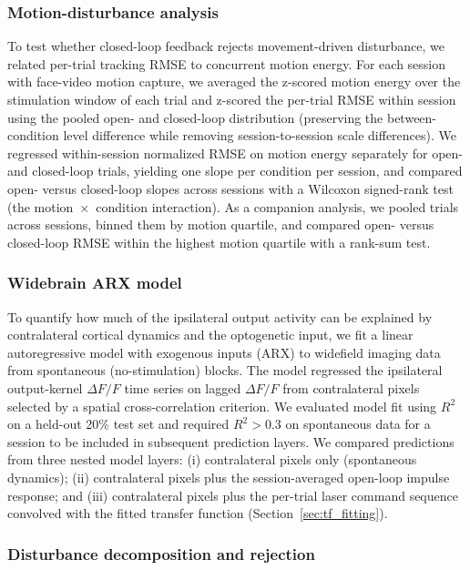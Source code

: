 \subsubsection*{Motion-disturbance analysis}

To test whether closed-loop feedback rejects movement-driven disturbance, we
related per-trial tracking RMSE to concurrent motion energy. For each session
with face-video motion capture, we averaged the z-scored motion energy over the
stimulation window of each trial and z-scored the per-trial RMSE within session
using the pooled open- and closed-loop distribution (preserving the
between-condition level difference while removing session-to-session scale
differences). We regressed within-session normalized RMSE on motion energy
separately for open- and closed-loop trials, yielding one slope per condition
per session, and compared open- versus closed-loop slopes across sessions with
a Wilcoxon signed-rank test (the motion~$\times$~condition interaction). As a
companion analysis, we pooled trials across sessions, binned them by motion
quartile, and compared open- versus closed-loop RMSE within the highest motion
quartile with a rank-sum test.

\subsubsection*{Widebrain ARX model}

To quantify how much of the ipsilateral output activity can be explained
by contralateral cortical dynamics and the optogenetic input, we fit a
linear autoregressive model with exogenous inputs (ARX) to widefield
imaging data from spontaneous (no-stimulation) blocks. The model
regressed the ipsilateral output-kernel $\Delta F/F$ time series on
lagged $\Delta F/F$ from contralateral pixels selected by a spatial
cross-correlation criterion. We evaluated model fit using $R^2$ on a
held-out 20\% test set and required $R^2 > 0.3$ on spontaneous data for
a session to be included in subsequent prediction layers. We compared
predictions from three nested model layers: (i) contralateral pixels
only (spontaneous dynamics); (ii) contralateral pixels plus the
session-averaged open-loop impulse response; and (iii) contralateral
pixels plus the per-trial laser command sequence convolved with the
fitted transfer function (Section~\ref{sec:tf_fitting}).

\subsubsection*{Disturbance decomposition and rejection}
\label{sec:disturbance_decomp}

